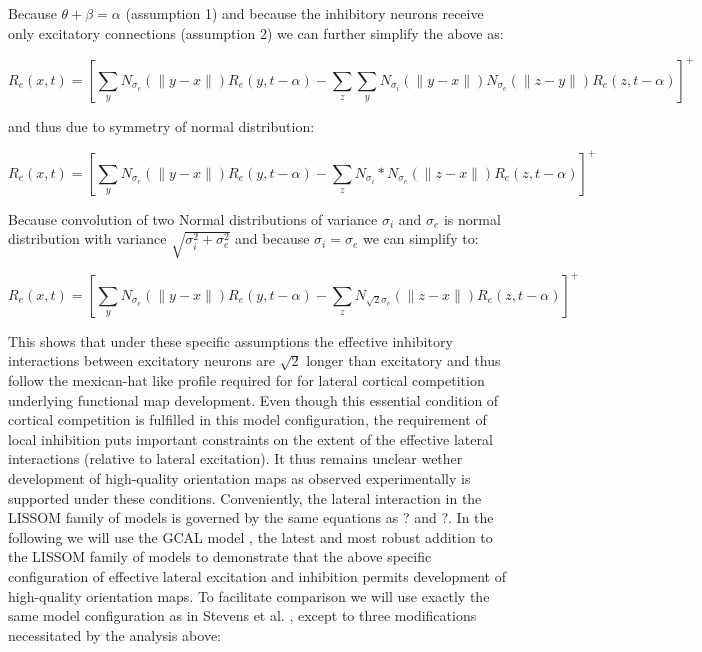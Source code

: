 \documentclass[a4paper,10pt]{article}
\begin{document}
\noindent Because $\theta + \beta = \alpha$ (assumption 1) and because the inhibitory neurons receive only excitatory connections (assumption 2) we can further simplify the above as:


\begin{equation}
R_{e}(x,t) = [\sum_{y}N_{\sigma_{e}}(\lVert y-x \rVert)R_{e}(y,t-\alpha) - \sum_{z}\sum_{y}N_{\sigma_{i}}(\lVert y-x \rVert) N_{\sigma_{e}}(\lVert z-y \rVert) R_{e}(z,t-\alpha)]^+
\end{equation}

\noindent and thus due to symmetry of normal distribution:

\begin{equation}
R_{e}(x,t) = [\sum_{y}N_{\sigma_{e}}(\lVert y-x \rVert)R_{e}(y,t-\alpha) - \sum_{z}N_{\sigma_{i}} \ast  N_{\sigma_{e}}(\lVert z-x \rVert) R_{e}(z,t-\alpha)]^+ 
\end{equation}

\noindent Because convolution of two Normal distributions of variance $\sigma_{i}$  and $\sigma_{e}$ is normal distribution with variance $\sqrt{\sigma_{i}^2 + \sigma_{e}^2}$ and 
because $\sigma_{i} = \sigma_{e}$ we can simplify to:

\begin{equation}
R_{e}(x,t) = [\sum_{y}N_{\sigma_{e}}(\lVert y-x \rVert)R_{e}(y,t-\alpha) - \sum_{z}N_{\sqrt{2}\sigma_{e}}(\lVert z-x \rVert) R_{e}(z,t-\alpha)]^+
\end{equation}

This shows that under these specific assumptions the effective inhibitory interactions between excitatory neurons are $\sqrt{2}$ longer than excitatory and thus
follow the mexican-hat like profile required for for lateral cortical competition underlying functional map development. Even though this essential condition of 
cortical competition is fulfilled in this model configuration, the requirement of local inhibition puts important constraints on the extent of the effective lateral
interactions (relative to lateral excitation). It thus remains unclear wether development of high-quality orientation maps as observed experimentally is 
supported under these conditions. Conveniently, the lateral interaction in the LISSOM family of models is governed by the same equations as ? and ?. 
In the following we will use the GCAL model \cite{Stevens2013}, the latest and most robust addition to the LISSOM family of models to demonstrate that the above specific configuration of effective lateral excitation and inhibition permits development of high-quality orientation maps. To facilitate comparison we will use exactly the same model configuration as in Stevens et al. \cite{Stevens2013}, except to three modifications necessitated by the analysis above:
\end{document}

